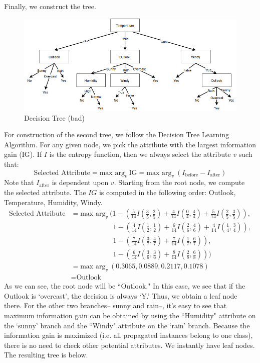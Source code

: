 \documentclass[12pt]{article}
\begin{document}
	Finally, we construct the tree.
	\begin{figure}[H]
		\begin{center}
			\includegraphics[width=440pt]{hw3_ml_tree1.jpg}
			\caption{Decision Tree (bad)}
			\label{fig:tree1}
		\end{center}
	\end{figure}
	For construction of the second tree, we follow the Decision Tree Learning Algorithm. For any given node, we pick the attribute with the largest information gain (IG). If $I$ is the entropy function, then we always select the attribute $v$ such that:
	\begin{equation*}
	\text{Selected Attribute} = \text{max arg}_{v} \ \text{IG} = \text{max arg}_{v} \ (I_{\text{before}}-I_{\text{after}})
	\end{equation*}
	Note that $I_{\text{after}}$ is dependent upon $v$. Starting from the root node, we compute the selected attribute. The $IG$ is computed in the following order: Outlook, Temperature, Humidity, Windy.
	\begin{align*}
	\text{Selected Attribute} &= \text{max arg}_{v} \  (1-(\frac{5}{14}I(\frac{3}{5},\frac{2}{5}) + \frac{4}{14}I(\frac{0}{4},\frac{4}{4}) + \frac{5}{14}I(\frac{2}{5},\frac{3}{5})), \\
	&\qquad\qquad\qquad 1-(\frac{4}{14}I(\frac{1}{2},\frac{1}{2}) + \frac{6}{14}I(\frac{2}{6},\frac{4}{6}) + \frac{4}{14}I(\frac{1}{4},\frac{3}{4})), \\
	&\qquad\qquad\qquad 1-(\frac{7}{14}I(\frac{3}{7},\frac{4}{7}) + \frac{7}{14}I(\frac{1}{7},\frac{6}{7})), \\
	&\qquad\qquad\qquad 1-(\frac{6}{14}I(\frac{3}{6},\frac{3}{6}) + \frac{8}{14}I(\frac{2}{8},\frac{6}{8}))) \\
	&= \text{max arg}_{v} \ (0.3065, 0.0889, 0.2117, 0.1078) \\
	&= \text{Outlook}
	\end{align*}
	As we can see, the root node will be ``Outlook." In this case, we see that if the Outlook is `overcast', the decision is always `Y.' Thus, we obtain a leaf node there. For the other two branches-- sunny and rain--, it's easy to see that maximum information gain can be obtained by using the ``Humidity" attribute on the `sunny' branch and the ``Windy" attribute on the `rain' branch. Because the information gain is maximized (i.e. all propagated instances belong to one class), there is no need to check other potential attributes. We instantly have leaf nodes. The resulting tree is below.
\end{document}
